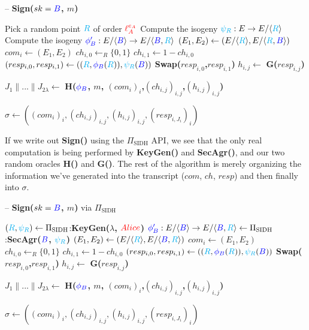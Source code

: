 \begin{algorithm}
\caption{-- \textbf{Sign($sk = \textcolor{blue}{B}$, $m$)}}\label{euclid}
\begin{algorithmic}[1]
	\State Pick a random point $\textcolor{cyan}{R}$ of order $\textcolor{red}{\ell_{A}^{e_A}}$
	\State Compute the isogeny $\textcolor{cyan}{\psi_R}: E \rightarrow E/\langle \textcolor{cyan}{R} \rangle$
	\State Compute the isogeny $\textcolor{blue}{\phi'_B} : E/\langle \textcolor{blue}{B} \rangle \rightarrow E/\langle \textcolor{blue}{B},\textcolor{cyan}{R} \rangle$
	\State $(E_{1},E_{2}) \gets (E/\langle \textcolor{cyan}{R} \rangle, E/\langle \textcolor{cyan}{R},\textcolor{blue}{B} \rangle)$
	\State $com_{i} \gets (E_{1}, E_{2})$
	\State $ch_{i,0} \gets_{R} \{0,1\}$
	\State $ch_{i,1} \gets 1 - ch_{i,0}$
	\State $(resp_{i,0}, resp_{i,1}) \gets ((\textcolor{cyan}{R},\textcolor{blue}{\phi_B}(\textcolor{cyan}{R})), \textcolor{cyan}{\psi_R}(\textcolor{blue}{B}))$
		\State \textbf{Swap($resp_{i,0}$,$resp_{i,1}$)}
	\EndIf
	\State $h_{i,j} \gets$ \textbf{G($resp_{i,j}$)}
\EndFor

\State $J_{1} \parallel ... \parallel J_{2\lambda} \gets$ \textbf{H($\textcolor{blue}{\phi_B}$, $m$, $(com_{i})_{i}$,$(ch_{i,j})_{i,j}$,$(h_{i,j})_{i,j}$)}

\State \Return $\sigma \gets ((com_{i})_{i}, (ch_{i,j})_{i,j}, (h_{i,j})_{i,j}, (resp_{i,J_{i}})_{i})$
\end{algorithmic}
\end{algorithm}

\noindent
If we write out \textbf{Sign()} using the $\Pi_{\text{SIDH}}$ API, we see that the only real computation is being performed by \textbf{KeyGen()} and \textbf{SecAgr()}, and our two random oracles \textbf{H()} and \textbf{G()}.  The rest of the algorithm is merely organizing the information we've generated into the transcript ($com$, $ch$, $resp$) and then finally into $\sigma$.

\begin{algorithm}
\caption{-- \textbf{Sign($sk = \textcolor{blue}{B}$, $m$)} via $\Pi_{\text{SIDH}}$}\label{euclid}
\begin{algorithmic}[1]
	\State $(\textcolor{cyan}{R},\textcolor{cyan}{\psi_R}) \gets \Pi_{\text{SIDH}}$:\textbf{KeyGen($\lambda$, $\textcolor{red}{Alice}$)}
	\State $\textcolor{blue}{\phi'_B}: E/\langle \textcolor{blue}{B} \rangle \rightarrow E/\langle \textcolor{blue}{B},\textcolor{cyan}{R} \rangle \gets \Pi_{\text{SIDH}}$:\textbf{SecAgr($\textcolor{blue}{B}$, $\textcolor{cyan}{\psi_R}$)}
	\State $(E_{1},E_{2}) \gets (E/\langle \textcolor{cyan}{R} \rangle, E/\langle \textcolor{blue}{B},\textcolor{cyan}{R} \rangle)$
	\State $com_{i} \gets (E_{1}, E_{2})$
	\State $ch_{i,0} \gets_{R} \{0,1\}$
	\State $ch_{i,1} \gets 1 - ch_{i,0}$
	\State $(resp_{i,0}, resp_{i,1}) \gets ((\textcolor{cyan}{R},\textcolor{blue}{\phi_B}(\textcolor{cyan}{R})), \textcolor{cyan}{\psi_R}(\textcolor{blue}{B}))$
		\State \textbf{Swap($resp_{i,0}$,$resp_{i,1}$)}
	\EndIf
	\State $h_{i,j} \gets$ \textbf{G($resp_{i,j}$)}
\EndFor

\State $J_{1} \parallel ... \parallel J_{2\lambda} \gets$ \textbf{H($\textcolor{blue}{\phi_B}$, $m$, $(com_{i})_{i}$,$(ch_{i,j})_{i,j}$,$(h_{i,j})_{i,j}$)}

\State \Return $\sigma \gets ((com_{i})_{i}, (ch_{i,j})_{i,j}, (h_{i,j})_{i,j}, (resp_{i,J_{i}})_{i})$
\end{algorithmic}
\end{algorithm}


